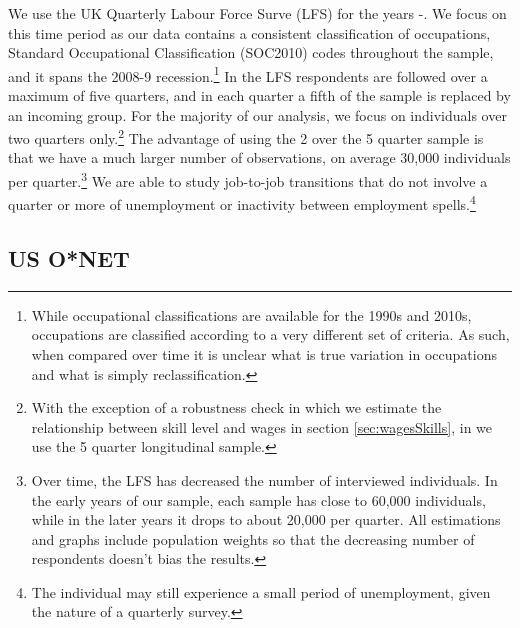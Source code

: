 \documentclass[11pt, oneside]{article}
\begin{document}
	We use the UK Quarterly Labour Force Surve (LFS) for the years \hspace{-1mm}-\hspace{-1mm}. We focus on this time period as our data contains a consistent classification of occupations, Standard Occupational Classification (SOC2010) codes throughout the sample, and it spans the 2008-9 recession.\footnote{While occupational classifications are available for the 1990s and 2010s, occupations are classified according to a very different set of criteria. As such, when compared over time it is unclear what is true variation in occupations and what is simply reclassification.}  In the LFS respondents are followed over a maximum of five quarters, and in each quarter a fifth of the sample is replaced by an incoming group. For the majority of our analysis, we focus on individuals over two quarters only.\footnote{With the exception of a robustness check in which we estimate the relationship between skill level and wages in section \ref{sec:wagesSkills}, in we use the 5 quarter longitudinal sample.} The advantage of using the 2 over the 5 quarter sample is that we have a much larger number of observations, on average 30,000 individuals per quarter.\footnote{Over time, the LFS has decreased the number of interviewed individuals. In the early years of our sample, each sample has close to 60,000 individuals, while in the later years it drops to about 20,000 per quarter. All estimations and graphs include population weights so that the decreasing number of respondents doesn't bias the results.} We are able to study job-to-job transitions that do not involve a quarter or more of unemployment or inactivity between employment spells.\footnote{The individual may still experience a small period of unemployment, given the nature of a quarterly survey.} 
	
	\subsection{US O*NET}
	\label{sec:ONET}
	
\end{document}
